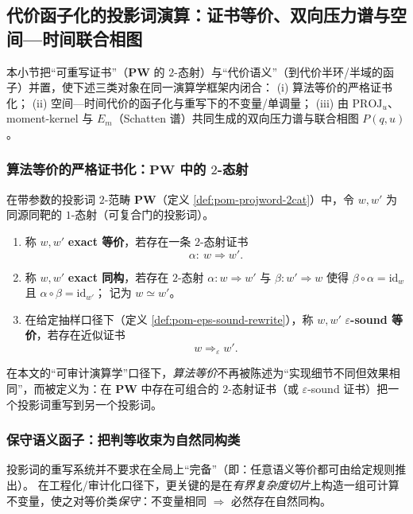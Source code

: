 \subsection{代价函子化的投影词演算：证书等价、双向压力谱与空间—时间联合相图}\label{subsec:pom-cost-functorial-calculus}
本小节把“可重写证书”（\(\mathbf{PW}\) 的 \(2\)-态射）与“代价语义”（到代价半环/半域的函子）并置，使下述三类对象在同一演算学框架内闭合：
(i) 算法等价的严格证书化；
(ii) 空间—时间代价的函子化与重写下的不变量/单调量；
(iii) 由 \(\mathrm{PROJ}_u\)、moment-kernel 与 \(E_m\)（Schatten 谱）共同生成的双向压力谱与联合相图 \(P(q,u)\)。

\subsubsection{算法等价的严格证书化：\texorpdfstring{$\mathbf{PW}$}{PW} 中的 \texorpdfstring{$2$}{2}-态射}\label{subsec:pom-alg-equivalence-as-2morphism}
\begin{definition}\label{def:pom-alg-equivalence-2morphism}
在带参数的投影词 \(2\)-范畴 \(\mathbf{PW}\)（定义 \ref{def:pom-projword-2cat}）中，令 \(w,w'\) 为同源同靶的 \(1\)-态射（可复合门的投影词）。
\begin{enumerate}
  \item 称 \(w,w'\) \textbf{exact 等价}，若存在一条 \(2\)-态射证书
  \[
  \alpha:\ w\Rightarrow w'.
  \]
  \item 称 \(w,w'\) \textbf{exact 同构}，若存在 \(2\)-态射 \(\alpha:w\Rightarrow w'\) 与 \(\beta:w'\Rightarrow w\) 使得
  \(
  \beta\circ\alpha=\mathrm{id}_w
  \)
  且
  \(
  \alpha\circ\beta=\mathrm{id}_{w'}
  \)；
  记为 \(w\simeq w'\)。
  \item 在给定抽样口径下（定义 \ref{def:pom-eps-sound-rewrite}），称 \(w,w'\) \textbf{\(\varepsilon\)-sound 等价}，若存在近似证书
  \[
  w\Longrightarrow_{\varepsilon} w'.
  \]
\end{enumerate}
在本文的“可审计演算学”口径下，\emph{算法等价}不再被陈述为“实现细节不同但效果相同”，而被定义为：在 \(\mathbf{PW}\) 中存在可组合的 \(2\)-态射证书（或 \(\varepsilon\)-sound 证书）把一个投影词重写到另一个投影词。
\end{definition}

\subsubsection{保守语义函子：把判等收束为自然同构类}\label{subsec:pom-semantic-conservative-functor}
投影词的重写系统并不要求在全局上“完备”（即：任意语义等价都可由给定规则推出）。
在工程化/审计化口径下，更关键的是在\emph{有界复杂度切片}上构造一组可计算不变量，使之对等价类\emph{保守}：不变量相同 \(\Rightarrow\) 必然存在自然同构。

